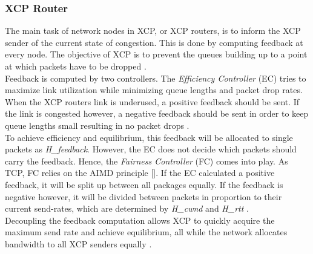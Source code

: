 \documentclass[a4paper,conference]{IEEEtran}
\begin{document}
\subsubsection*{XCP Router}
The main task of network nodes in XCP, or XCP routers, is to inform the XCP sender of the current state of congestion. This is done by computing feedback at every node. The objective of XCP is to prevent the queues building up to a point at which packets have to be dropped \cite{katabi2002congestion}.\\
Feedback is computed by two controllers. The \textit{Efficiency Controller} (EC) tries to maximize link utilization while minimizing queue lengths and packet drop rates. When the XCP routers link is underused, a positive feedback should be sent. If the link is congested however, a negative feedback should be sent in order to keep queue lengths small resulting in no packet drops \cite{katabi2002congestion,1498331}.\\
To achieve efficiency and equilibrium, this feedback will be allocated to single packets as \textit{H\_feedback}. However, the EC does not decide which packets should carry the feedback. Hence, the \textit{Fairness Controller} (FC) comes into play. As TCP, FC relies on the AIMD principle []. If the EC calculated a positive feedback, it will be split up between all packages equally. If the feedback is negative however, it will be divided between packets in proportion to their current send-rates, which are determined by \textit{H\_cwnd} and \textit{H\_rtt} \cite{katabi2002congestion,1498331}.\\
Decoupling the feedback computation allows XCP to quickly acquire the maximum send rate and achieve equilibrium, all while the network allocates bandwidth to all XCP senders equally \cite{katabi2002congestion}.
\end{document}
